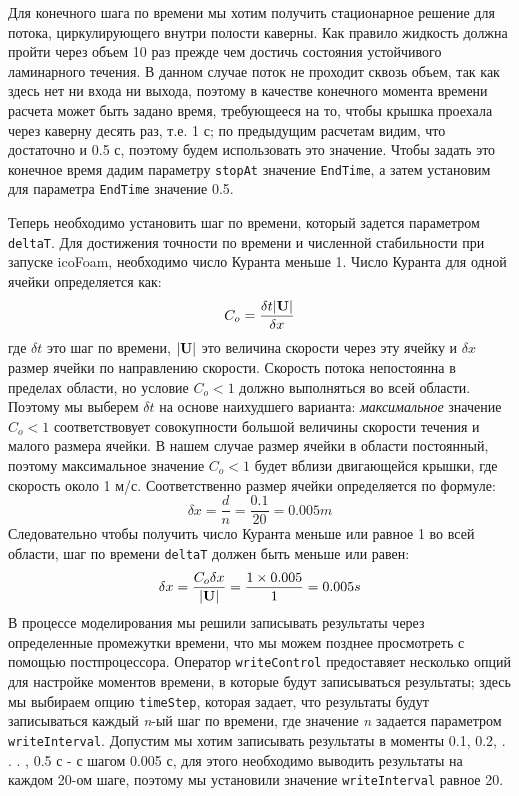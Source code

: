 Для конечного шага по времени мы хотим получить стационарное решение для потока, циркулирующего внутри полости каверны.
 Как правило жидкость должна пройти через объем 10 раз прежде чем достичь состояния устойчивого ламинарного течения. 
В данном случае поток не проходит сквозь объем, так как здесь нет ни входа ни выхода,
 поэтому в качестве конечного момента времени расчета может быть задано время, требующееся на то, чтобы крышка проехала
 через каверну десять раз, т.е. 1 с; по предыдущим расчетам видим, что достаточно и 0.5 с, поэтому будем использовать
 это значение. Чтобы задать это конечное время дадим параметру \texttt{stopAt} значение \texttt{EndTime},
 а затем установим для параметра \texttt{EndTime} значение 0.5.

Теперь необходимо установить шаг по времени, который задется параметром \texttt{deltaT}. 
Для достижения  точности по времени и численной стабильности при запуске icoFoam,
 необходимо число Куранта меньше 1. Число Куранта для одной ячейки определяется как:
\begin{equation}
 C_o = \frac{\delta t|\bf U|}{\delta x}
\end{equation}
где $\delta t$ это шаг по времени, $|\bf U|$ это величина скорости через эту ячейку и $\delta x$ размер ячейки 
по направлению скорости. Скорость потока непостоянна в пределах области, но условие
 $C_o<1$ должно выполняться во всей области. Поэтому мы выберем $\delta t$ на основе наихудшего варианта:
 \textit{максимальное} значение $C_o<1$ соответствовует совокупности большой величины скорости
 течения и малого размера ячейки. В нашем случае размер ячейки в области постоянный,
 поэтому максимальное значение $C_o<1$ будет вблизи двигающейся крышки, где скорость около 1 м/с.
 Соответственно размер ячейки определяется по формуле:
\begin{equation}
 \delta x = \frac{d}{n} = \frac{0.1}{20} = 0.005 m
\end{equation}
Следовательно чтобы получить число Куранта меньше или равное 1 во всей области, шаг по времени \texttt{deltaT}
 должен быть меньше или равен:
\begin{equation}
 \delta x = \frac{C_o \delta x}{|\bf U|} = \frac{1 \times 0.005}{1} = 0.005 s
\end{equation}
В процессе моделирования мы решили записывать результаты через определенные промежутки времени,
 что мы можем позднее просмотреть с помощью постпроцессора. Оператор \texttt{writeControl} предоставяет несколько
 опций для настройке моментов времени, в которые будут записываться результаты; здесь мы выбираем опцию \texttt{timeStep},
 которая задает, что результаты будут записываться каждый \textit{n}-ый шаг по времени,
 где значение \textit{n} задается параметром \texttt{writeInterval}. Допустим мы хотим записывать
 результаты в моменты 0.1, 0.2, . . . , 0.5 с - с шагом 0.005 с, для этого необходимо выводить результаты на каждом
 20-ом шаге, поэтому мы установили значение \texttt{writeInterval} равное 20.

